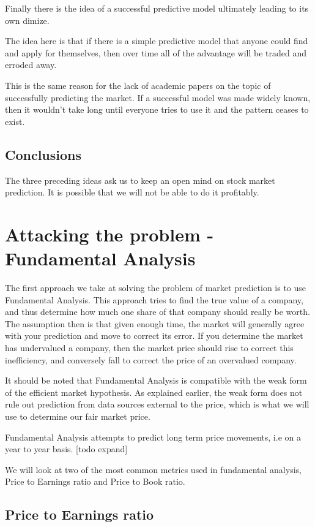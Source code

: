 \documentclass{report}
\begin{document}
Finally there is the idea of a successful predictive model ultimately leading to its own dimize. 

The idea here is that if there is a simple predictive model that anyone could find and apply for themselves, then over time all of the advantage will be traded and erroded away.

This is the same reason for the lack of academic papers on the topic of successfully predicting the market. If a successful model was made widely known, then it wouldn't take long until everyone tries to use it and the pattern ceases to exist.

\section{Conclusions}

The three preceding ideas ask us to keep an open mind on stock market prediction. It is possible that we will not be able to do it profitably.

\chapter{Attacking the problem - Fundamental Analysis}

The first approach we take at solving the problem of market prediction is to use Fundamental Analysis. This approach tries to find the true value of a company, and thus determine how much one share of that company should really be worth. The assumption then is that given enough time, the market will generally agree with your prediction and move to correct its error. If you determine the market has undervalued a company, then the market price should rise to correct this inefficiency, and conversely fall to correct the price of an overvalued company. 

It should be noted that Fundamental Analysis is compatible with the weak form of the efficient market hypothesis. As explained earlier, the weak form does not rule out prediction from data sources external to the price, which is what we will use to determine our fair market price.

Fundamental Analysis attempts to predict long term price movements, i.e on a year to year basis. [todo expand]

We will look at two of the most common metrics used in fundamental analysis, Price to Earnings ratio and Price to Book ratio.

\section{Price to Earnings ratio}
\end{document}
